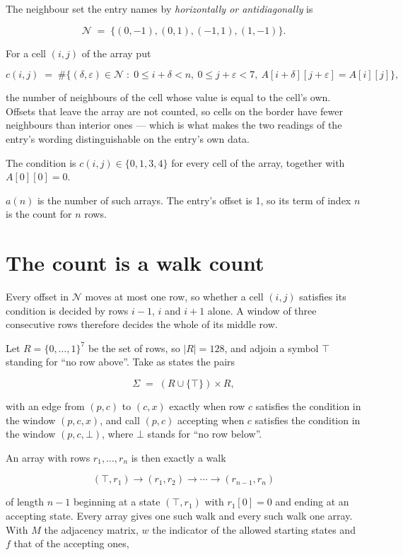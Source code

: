 \documentclass[11pt]{article}
\theoremstyle{definition}
\begin{document}
The neighbour set the entry names by {\itshape horizontally or antidiagonally} is

\[\mathcal{N} \;=\; \{(0,-1), (0,1), (-1,1), (1,-1)\}.\]

For a cell $(i,j)$ of the array put

\[c(i,j) \;=\; \#\bigl\{(\delta,\varepsilon)\in\mathcal{N} \;:\; 0\le i+\delta<n,\ 0\le j+\varepsilon<7,\ A[i+\delta][j+\varepsilon] = A[i][j]\bigr\},\]

the number of neighbours of the cell whose value is equal to the cell's own. Offsets that leave the array are not counted, so cells on the border have fewer neighbours than interior ones --- which is what makes the two readings of the entry's wording distinguishable on the entry's own data.

The condition is $c(i,j) \in \{0, 1, 3, 4\}$ for every cell of the array, together with $A[0][0]=0$.

$a(n)$ is the number of such arrays. The entry's offset is 1, so its term of index $n$ is the count for $n$ rows.

\section{The count is a walk count}

Every offset in $\mathcal{N}$ moves at most one row, so whether a cell $(i,j)$ satisfies its condition is decided by rows $i-1$, $i$ and $i+1$ alone. A window of three consecutive rows therefore decides the whole of its middle row.

Let $R = \{0,\dots,1\}^{7}$ be the set of rows, so $|R| = 128$, and adjoin a symbol $\top$ standing for ``no row above''. Take as states the pairs

\[\Sigma \;=\; (R \cup \{\top\}) \times R,\]

with an edge from $(p,c)$ to $(c,x)$ exactly when row $c$ satisfies the condition in the window $(p,c,x)$, and call $(p,c)$ accepting when $c$ satisfies the condition in the window $(p,c,\bot)$, where $\bot$ stands for ``no row below''.

An array with rows $r_1,\dots,r_n$ is then exactly a walk

\[(\top,r_1) \to (r_1,r_2) \to \cdots \to (r_{n-1},r_n)\]

of length $n-1$ beginning at a state $(\top,r_1)$ with $r_1[0]=0$ and ending at an accepting state. Every array gives one such walk and every such walk one array. With $M$ the adjacency matrix, $w$ the indicator of the allowed starting states and $f$ that of the accepting ones,
\end{document}
